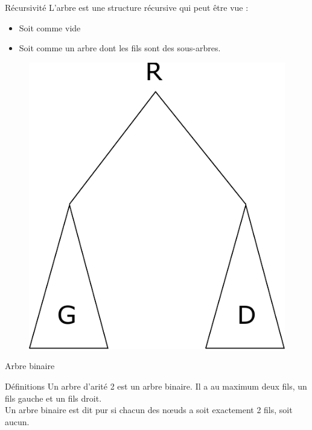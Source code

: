 \documentclass[12pt,a4paper]{beamer}
\newcommand{\hl}[1]{\textcolor{blueemph}{#1}}
\begin{document}
\begin{frame}{Récursivité}
L'arbre est une structure récursive qui peut être vue : 
\begin{itemize}
\item Soit comme vide
\item Soit comme un arbre dont les fils sont des sous-arbres. 
\end{itemize}
\begin{figure}
\includegraphics[scale=0.4]{figs/rec_tree}
\end{figure}

\end{frame}


\begin{frame}{Arbre binaire}
\begin{block}{Définitions}
Un arbre d'arité 2 est un \hl{arbre binaire}. Il a au maximum deux fils, un fils gauche et un fils droit.\\
Un arbre binaire est dit \hl{pur} si chacun des n\oe uds a soit exactement 2 fils, soit aucun.
\end{block}

\end{frame}
\end{document}
